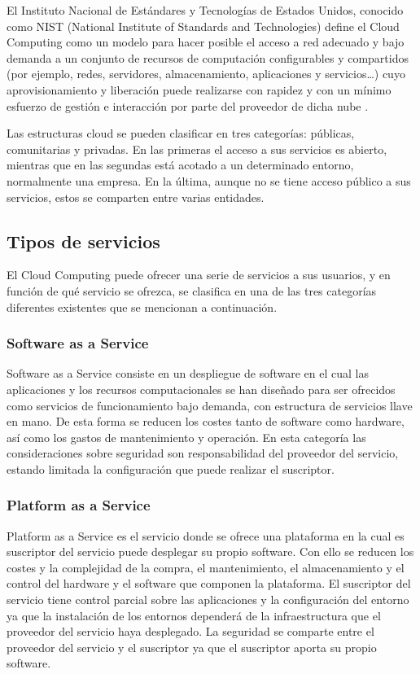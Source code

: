 El Instituto Nacional de Estándares y Tecnologías de Estados Unidos, conocido como NIST (National Institute of Standards and Technologies) define el Cloud Computing como un modelo para hacer posible el acceso a red adecuado y bajo demanda a un conjunto de recursos de computación configurables y compartidos (por ejemplo, redes, servidores, almacenamiento, aplicaciones y servicios…) cuyo aprovisionamiento y liberación puede realizarse con rapidez y con un mínimo esfuerzo de gestión e interacción por parte del proveedor de dicha nube \cite{inteco-cloud}.

Las estructuras cloud se pueden clasificar en tres categorías: públicas, comunitarias y privadas. En las primeras el acceso a sus servicios es abierto, mientras que en las segundas está acotado a un determinado entorno, normalmente una empresa. En la última, aunque no se tiene acceso público a sus servicios, estos se comparten entre varias entidades.

\subsection{Tipos de servicios}

El Cloud Computing puede ofrecer una serie de servicios a sus usuarios, y en función de qué servicio se ofrezca, se clasifica en una de las tres categorías diferentes existentes que se mencionan a continuación.

\subsubsection{Software as a Service}

Software as a Service consiste en un despliegue de software en el cual las aplicaciones y los recursos computacionales se han diseñado para ser ofrecidos como servicios de funcionamiento bajo demanda, con estructura de servicios llave en mano. De esta forma se reducen los costes tanto de software como hardware, así como los gastos de mantenimiento y operación. En esta categoría las consideraciones sobre seguridad son responsabilidad del proveedor del servicio, estando limitada la configuración que puede realizar el suscriptor.

\subsubsection{Platform as a Service}

Platform as a Service es el servicio donde se ofrece una plataforma en la cual es suscriptor del servicio puede desplegar su propio software. Con ello se reducen los costes y la complejidad de la compra, el mantenimiento, el almacenamiento y el control del hardware y el software que componen la plataforma. El suscriptor del servicio tiene control parcial sobre las aplicaciones y la configuración del entorno ya que la instalación de los entornos dependerá de la infraestructura que el proveedor del servicio haya desplegado. La seguridad se comparte entre el proveedor del servicio y el suscriptor ya que el suscriptor aporta su propio software.

